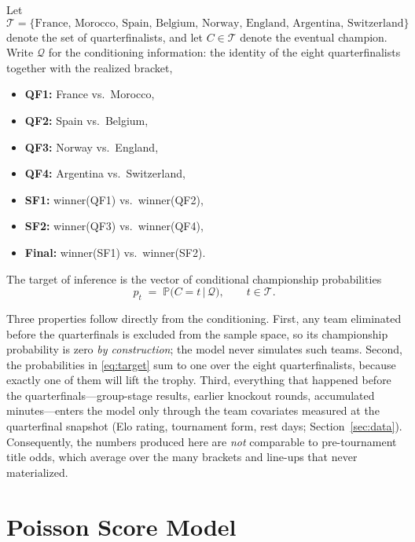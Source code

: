 \documentclass[11pt]{article}
\newcommand{\Prob}{\mathbb{P}}
\begin{document}
Let
\[
\mathcal{T} = \{\text{France, Morocco, Spain, Belgium, Norway, England,
Argentina, Switzerland}\}
\]
denote the set of quarterfinalists, and let $C \in \mathcal{T}$ denote the
eventual champion. Write $\mathcal{Q}$ for the conditioning information: the
identity of the eight quarterfinalists together with the realized bracket,

\begin{itemize}
  \item \textbf{QF1:} France vs.\ Morocco,
  \item \textbf{QF2:} Spain vs.\ Belgium,
  \item \textbf{QF3:} Norway vs.\ England,
  \item \textbf{QF4:} Argentina vs.\ Switzerland,
  \item \textbf{SF1:} winner(QF1) vs.\ winner(QF2),
  \item \textbf{SF2:} winner(QF3) vs.\ winner(QF4),
  \item \textbf{Final:} winner(SF1) vs.\ winner(SF2).
\end{itemize}

The target of inference is the vector of conditional championship
probabilities
\begin{equation}
p_t \;=\; \Prob\bigl(C = t \,\big|\, \mathcal{Q}\bigr),
\qquad t \in \mathcal{T}.
\label{eq:target}
\end{equation}

Three properties follow directly from the conditioning. First, any team
eliminated before the quarterfinals is excluded from the sample space, so its
championship probability is zero \emph{by construction}; the model never
simulates such teams. Second, the probabilities in \eqref{eq:target} sum to
one over the eight quarterfinalists, because exactly one of them will lift the
trophy. Third, everything that happened before the quarterfinals---group-stage
results, earlier knockout rounds, accumulated minutes---enters the model only
through the team covariates measured at the quarterfinal snapshot (Elo rating,
tournament form, rest days; Section~\ref{sec:data}). Consequently, the numbers
produced here are \emph{not} comparable to pre-tournament title odds, which
average over the many brackets and line-ups that never materialized.

\section{Poisson Score Model}
\label{sec:poisson}
\end{document}
